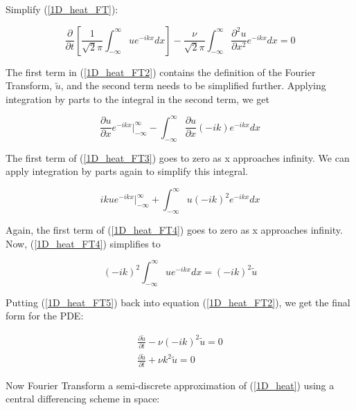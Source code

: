\documentclass[10pt]{article}
\begin{document}
	Simplify (\ref{1D_heat_FT}):
	
	\begin{equation} \label{1D_heat_FT2}
		\frac{\partial}{\partial t} \left[ \frac{1}{\sqrt{2}\pi} \int_{-\infty}^{\infty} u e^{-ikx} dx \right] - \frac{\nu}{\sqrt{2}\pi} \int_{-\infty}^{\infty} \frac{\partial^2 u}{\partial x^2}  e^{-ikx} dx = 0
	\end{equation}

	The first term in (\ref{1D_heat_FT2}) contains the definition of the Fourier Transform, $\tilde{u}$, and the second term needs to be simplified further. Applying integration by parts to the integral in the second term, we get

	\begin{equation} \label{1D_heat_FT3}
		\frac{\partial u}{\partial x} e^{-ikx} \Big|_{-\infty}^{\infty} - \int_{-\infty}^{\infty} \frac{\partial u}{\partial x} (-ik) e^{-ikx} dx
	\end{equation}
	
	The first term of (\ref{1D_heat_FT3}) goes to zero as x approaches infinity. We can apply integration by parts again to simplify this integral.
	
	\begin{equation} \label{1D_heat_FT4}
		iku e^{-ikx} \Big|_{-\infty}^{\infty} + \int_{-\infty}^{\infty} u (-ik)^2 e^{-ikx} dx
	\end{equation}

	Again, the first term of (\ref{1D_heat_FT4}) goes to zero as x approaches infinity. Now, (\ref{1D_heat_FT4}) simplifies to
	
	\begin{equation} \label{1D_heat_FT5}
		(-ik)^2 \int_{-\infty}^{\infty} u e^{-ikx} dx = (-ik)^2 \tilde{u}
	\end{equation}

	Putting (\ref{1D_heat_FT5}) back into equation (\ref{1D_heat_FT2}), we get the final form for the PDE:
	
	\begin{equation} \label{1D_heat_FT6}
		\begin{aligned}
			\frac{\partial \tilde{u}}{\partial t} - \nu (-ik)^2 \tilde{u} = 0 \\
			\frac{\partial \tilde{u}}{\partial t} + \nu k^2 \tilde{u} = 0
		\end{aligned}
	\end{equation}

	

	Now Fourier Transform a semi-discrete approximation of (\ref{1D_heat}) using a central differencing scheme in space:
	
\end{document}
